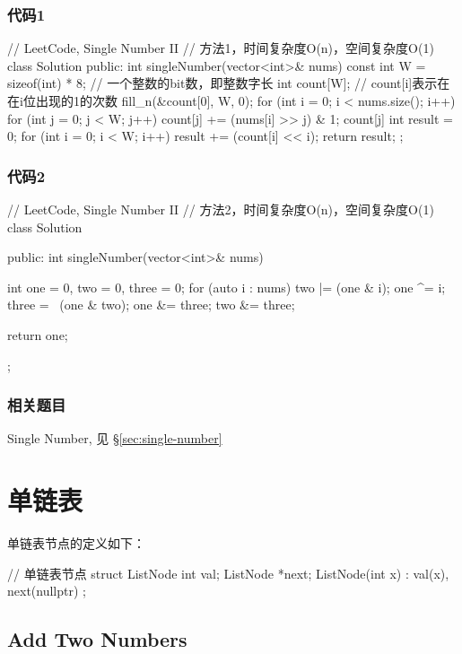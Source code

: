\subsubsection{代码1}
\begin{Code}
// LeetCode, Single Number II
// 方法1，时间复杂度O(n)，空间复杂度O(1)
class Solution {
public:
    int singleNumber(vector<int>& nums) {
        const int W = sizeof(int) * 8; // 一个整数的bit数，即整数字长
        int count[W];  // count[i]表示在在i位出现的1的次数
        fill_n(&count[0], W, 0);
        for (int i = 0; i < nums.size(); i++) {
            for (int j = 0; j < W; j++) {
                count[j] += (nums[i] >> j) & 1;
                count[j] %
            }
        }
        int result = 0;
        for (int i = 0; i < W; i++) {
            result += (count[i] << i);
        }
        return result;
    }
};
\end{Code}


\subsubsection{代码2}
\begin{Code}
// LeetCode, Single Number II
// 方法2，时间复杂度O(n)，空间复杂度O(1)
class Solution {
public:
    int singleNumber(vector<int>& nums) {
        int one = 0, two = 0, three = 0;
        for (auto i : nums) {
            two |= (one & i);
            one ^= i;
            three = ~(one & two);
            one &= three;
            two &= three;
        }

        return one;
    }
};
\end{Code}


\subsubsection{相关题目}
\begindot
\item  Single Number, 见 \S \ref{sec:single-number}
\myenddot


\section{单链表} %

单链表节点的定义如下：
\begin{Code}
// 单链表节点
struct ListNode {
    int val;
    ListNode *next;
    ListNode(int x) : val(x), next(nullptr) { }
};
\end{Code}


\subsection{Add Two Numbers}
\label{sec:add-two-numbers}


